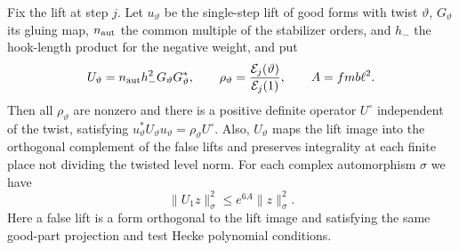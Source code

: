 \begin{lemma}
\label{lem:c-comparison-operator}
\emitthmsource
Fix the lift at step $j$. Let $u_\vartheta$ be the single-step lift of good forms with twist $\vartheta$, $G_\vartheta$ its gluing map, $n_{\rm aut}$ the common multiple of the stabilizer orders, and $h_-$ the hook-length product for the negative weight, and put
\[
 U_\vartheta=n_{\rm aut}h_-^2G_\vartheta G_\vartheta^*,
 \qquad
 \rho_\vartheta=\frac{\mathcal E_j(\vartheta)}{\mathcal E_j(1)},
 \qquad A=fmb\ell^2 .
\]
Then all $\rho_\vartheta$ are nonzero and there is a positive definite operator $U^\circ$ independent of the twist, satisfying $u_\vartheta^*U_\vartheta u_\vartheta=\rho_\vartheta U^\circ$. Also, $U_\vartheta$ maps the lift image into the orthogonal complement of the false lifts and preserves integrality at each finite place not dividing the twisted level norm. For each complex automorphism $\sigma$ we have
\[
 \|U_1 z\|_\sigma^2\le e^{6A}\|z\|_\sigma^2 .
\]
Here a false lift is a form orthogonal to the lift image and satisfying the same good-part projection and test Hecke polynomial conditions.
\end{lemma}

